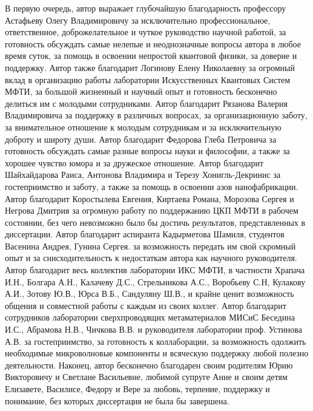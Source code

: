 В первую очередь, автор выражает глубочайшую благодарность профессору Астафьеву Олегу Владимировичу за исключительно профессиональное, ответственное, доброжелательное и чуткое руководство научной работой, за готовность обсуждать самые нелепые и неоднозначные вопросы автора в любое время суток, за помощь в освоении непростой квантовой физики, за доверие и поддержку. Автор также благодарит Логинову Елену Николаевну за огромный вклад в организацию работы лаборатории Искусственных Квантовых Систем МФТИ, за большой жизненный и научный опыт и готовность бесконечно делиться им с молодыми сотрудниками. Автор благодарит Рязанова Валерия Владимировича за поддержку в различных вопросах, за организационную заботу, за внимательное отношение к молодым сотрудникам и за исключительную доброту и широту души. Автор благодарит Федорова Глеба Петровича за готовность обсуждать самые разные вопросы науки и философии, а также за хорошее чувство юмора и за дружеское отношение. Автор благодарит Шайхайдарова Раиса, Антонова Владимира и Терезу Хонигль-Декринис за гостеприимство и  заботу, а также за помощь в освоении азов нанофабрикации. Автор благодарит Коростылева Евгения, Киртаева Романа, Морозова Сергея и Негрова Дмитрия за огромную работу по поддержанию ЦКП МФТИ в рабочем состоянии, без чего невозможно было бы достичь результатов, представленных в диссертации. Автор благодарит аспиранта Кадырметова Шамиля, студентов Васенина Андрея, Гунина Сергея. за возможность передать им свой скромный опыт и за снисходительность к недостаткам автора как научного руководителя.  Автор благодарит весь коллектив лаборатории ИКС МФТИ, в частности Храпача И.Н., Болгара А.Н., Калачеву Д.С., Стрельникова А.С., Воробьеву С.Н, Кулакову А.И., Зотову Ю.В., Юрса В.Б., Сандуляну Ш.В., и крайне ценит возможность общения и совместной работы с каждым из своих коллег.  Автор благодарит сотрудников лаборатории сверхпроводящих метаматериалов МИСиС Беседина И.С., Абрамова Н.В., Чичкова В.В. и руководителя лаборатории проф. Устинова А.В. за гостеприимство, за готовность к коллаборации, за возможность одолжить необходимые микроволновые компоненты и всяческую поддержку любой полезно деятельности. Наконец, автор бесконечно благодарен своим родителям Юрию Викторовичу и Светлане Васильевне, любимой супруге Анне и своим детям Елизавете, Василисе, Федору и Вере за любовь, терпение, поддержку и понимание, без которых диссертация не была бы завершена. 

